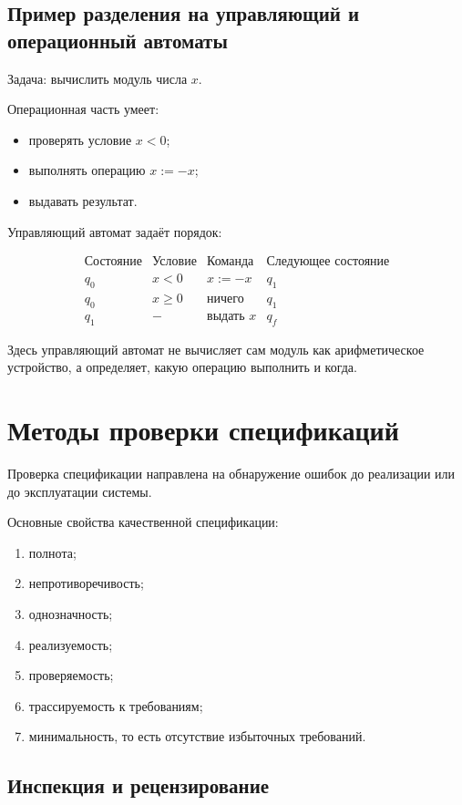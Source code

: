 \documentclass[12pt,a4paper]{article}
\begin{document}
\subsection{Пример разделения на управляющий и операционный автоматы}

Задача: вычислить модуль числа $x$.

Операционная часть умеет:
\begin{itemize}
    \item проверять условие $x < 0$;
    \item выполнять операцию $x := -x$;
    \item выдавать результат.
\end{itemize}

Управляющий автомат задаёт порядок:

\[
\begin{array}{c|c|c|c}
\text{Состояние} & \text{Условие} & \text{Команда} & \text{Следующее состояние} \\
\hline
q_0 & x < 0 & x := -x & q_1 \\
q_0 & x \geq 0 & \text{ничего} & q_1 \\
q_1 & - & \text{выдать } x & q_f
\end{array}
\]

Здесь управляющий автомат не вычисляет сам модуль как арифметическое устройство, а определяет, какую операцию выполнить и когда.

\section{Методы проверки спецификаций}

Проверка спецификации направлена на обнаружение ошибок до реализации или до эксплуатации системы.

Основные свойства качественной спецификации:
\begin{enumerate}
    \item полнота;
    \item непротиворечивость;
    \item однозначность;
    \item реализуемость;
    \item проверяемость;
    \item трассируемость к требованиям;
    \item минимальность, то есть отсутствие избыточных требований.
\end{enumerate}

\subsection{Инспекция и рецензирование}
\end{document}
